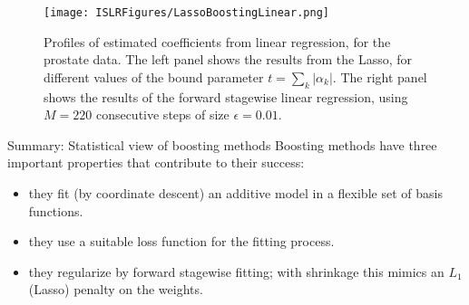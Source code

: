 \documentclass{beamer}
\begin{document}
                            \begin{frame}{}
                                        \begin{figure}
                          \centering
                          
                          \centering
                          \texttt{[image: ISLRFigures/LassoBoostingLinear.png]}
                          \caption{Profiles of estimated coefficients from linear regression, for the
prostate data. The left panel shows the results from the Lasso,
for different values of the bound parameter $t = \sum_k|\alpha_k|$. The right panel shows
the results of the forward stagewise linear regression, using $M = 220$ consecutive steps of size $\epsilon=0.01$.
                          }
                        \end{figure}
                            \end{frame}

              \begin{frame}{Summary: Statistical view of boosting methods}
                    Boosting methods have three important properties that contribute to their success:
                     \begin{itemize}
                      \item they fit (by coordinate descent) an additive model in a flexible set of basis functions.

                      \item they use a suitable loss function for the fitting process.

                      \item they regularize by forward stagewise fitting; with shrinkage this mimics an $L_1$ (Lasso) penalty on the weights.
                     \end{itemize}
                     \end{frame}
                      
      			
      			
      				
      			
   
      		
      				
      				
      				
      				
      				
      
    
\end{document}
